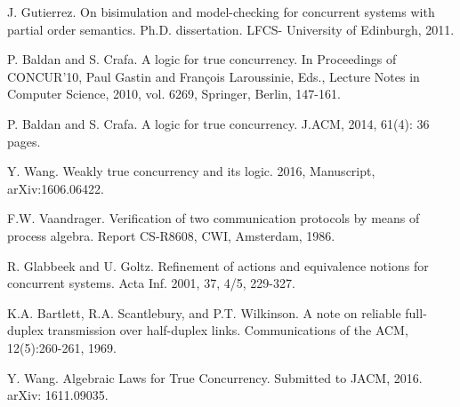 \begin{thebibliography}{Lam94}
J. Gutierrez. On bisimulation and model-checking for concurrent systems with partial order semantics. Ph.D. dissertation. LFCS- University of Edinburgh, 2011.

P. Baldan and S. Crafa. A logic for true concurrency. In Proceedings of CONCUR'10, Paul Gastin and Fran\c{c}ois Laroussinie, Eds., Lecture Notes in Computer Science, 2010, vol. 6269, Springer, Berlin, 147-161.

P. Baldan and S. Crafa. A logic for true concurrency. J.ACM, 2014, 61(4): 36 pages.

Y. Wang. Weakly true concurrency and its logic. 2016, Manuscript, arXiv:1606.06422.

 F.W. Vaandrager. Verification of two communication protocols by means of process algebra. Report CS-R8608, CWI, Amsterdam, 1986.

 R. Glabbeek and U. Goltz. Refinement of actions and equivalence notions for concurrent systems. Acta Inf. 2001, 37, 4/5, 229-327.

 K.A. Bartlett, R.A. Scantlebury, and P.T. Wilkinson. A note on reliable full-duplex transmission over half-duplex links. Communications of the ACM, 12(5):260-261, 1969.

Y. Wang. Algebraic Laws for True Concurrency. Submitted to JACM, 2016. arXiv: 1611.09035.

\end{thebibliography}

